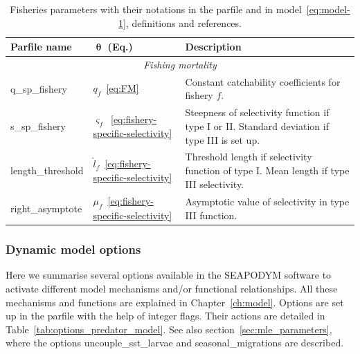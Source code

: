 \begin{table}[H]
\caption{Fisheries parameters with their notations in the parfile and in model~\ref{eq:model-1}, definitions and  references.}
  \begin{tabular}{p{3.75cm}p{1.75cm}p{9.75cm}}\hline
    \textbf{Parfile name}	& $\boldsymbol \uptheta$ (\textbf{Eq.})&  \textbf{Description}	\\\hline 
     \multicolumn{3}{c}{\textit{ Fishing mortality}} \\
    \hline
     {\ttfamily q\_sp\_fishery}  & $q_f$~\eqref{eq:FM} & Constant catchability coefficients for fishery $f$.\\
    {\ttfamily s\_sp\_fishery}  & $\varsigma_f$~\eqref{eq:fishery-specific-selectivity}  &  Steepness of selectivity function if type I or II. Standard deviation if type III is set up.\\
    {\ttfamily length\_threshold} & $\hat{l}_f$~\eqref{eq:fishery-specific-selectivity} &  Threshold length if selectivity function of type I. Mean length if type III selectivity.  \\
    {\ttfamily right\_asymptote} & $\mu_f$~\eqref{eq:fishery-specific-selectivity}&  Asymptotic value of selectivity in type III function.\\
    \hline			    
  \end{tabular}
\label{tab:fisheries-xml}  
\end{table}


\subsubsection{Dynamic model options} 
\label{sec:model-options}

Here we summarise several options available in the SEAPODYM software to activate different model mechanisms and/or functional relationships. All these mechanisms and functions are explained in Chapter~\ref{ch:model}. Options are set up in the parfile with the help of integer flags. Their actions are detailed in Table~\ref{tab:options_predator_model}. See also section~\ref{sec:mle_parameters}, where the options {\ttfamily uncouple\_sst\_larvae} and  {\ttfamily seasonal\_migrations} are described.

